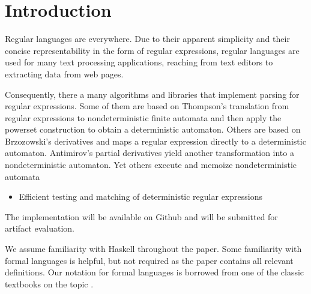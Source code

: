 \section{Introduction}

Regular languages are everywhere. Due to their apparent simplicity and
their concise representability in the form of regular expressions,
regular languages are used for many text processing
applications, reaching from text editors
\cite{DBLP:journals/cacm/Thompson68} to extracting data from web
pages.

Consequently, there a many algorithms and libraries that implement
parsing for regular expressions. Some of them are based on Thompson's
translation from regular expressions to nondeterministic finite
automata and then apply the powerset construction to obtain a
deterministic automaton. Others are based on Brzozowski's derivatives
\cite{Brzozowski1964} and
maps a regular expression directly to a deterministic
automaton. Antimirov's partial derivatives \cite{Antimirov96Partial}
yield another transformation into a nondeterministic automaton.
Yet others execute and memoize nondeterministic automata 

\begin{itemize}
\item Efficient testing and matching of deterministic regular
  expressions \cite{DBLP:journals/jcss/GrozM17}
\end{itemize}
\TODO{}

The implementation will be available on Github and will be submitted for artifact evaluation. 


We assume familiarity with Haskell throughout the paper.  Some
familiarity with formal languages is helpful, but not required as the
paper contains all relevant definitions. Our notation for formal
languages is borrowed from one of the classic textbooks on the topic
\cite{DBLP:books/daglib/0011126}.

